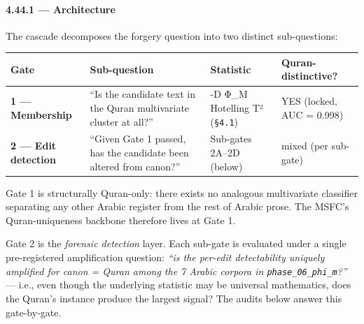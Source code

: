 \documentclass[
]{article}
\newcounter{none} %
\begin{document}
\paragraph{4.44.1 --- Architecture}\label{architecture}

The cascade decomposes the forgery question into two distinct
sub-questions:

{\def\LTcaptype{none} %
\begin{longtable}[]{@{}
  >{\raggedright\arraybackslash}p{}
  >{\raggedright\arraybackslash}p{}
  >{\raggedright\arraybackslash}p{}
  >{\raggedright\arraybackslash}p{}@{}}
\toprule\noalign{}
\begin{minipage}[b]{\linewidth}\raggedright
Gate
\end{minipage} & \begin{minipage}[b]{\linewidth}\raggedright
Sub-question
\end{minipage} & \begin{minipage}[b]{\linewidth}\raggedright
Statistic
\end{minipage} & \begin{minipage}[b]{\linewidth}\raggedright
Quran-distinctive?
\end{minipage} \\
\midrule\noalign{}
\endhead
\bottomrule\noalign{}
\endlastfoot
\textbf{1 --- Membership} & ``Is the candidate text in the Quran
multivariate cluster at all?'' & 5-D Φ\_M Hotelling T² (\texttt{§4.1}) &
YES (locked, AUC = 0.998) \\
\textbf{2 --- Edit detection} & ``Given Gate 1 passed, has the candidate
been altered from canon?'' & Sub-gates 2A--2D (below) & mixed (per
sub-gate) \\
\end{longtable}
}

Gate 1 is structurally Quran-only: there exists no analogous
multivariate classifier separating any other Arabic register from the
rest of Arabic prose. The MSFC's Quran-uniqueness backbone therefore
lives at Gate 1.

Gate 2 is the \emph{forensic detection} layer. Each sub-gate is
evaluated under a single pre-registered amplification question:
\emph{``is the per-edit detectability uniquely amplified for canon =
Quran among the 7 Arabic corpora in \texttt{phase\_06\_phi\_m}?''} ---
i.e., even though the underlying statistic may be universal mathematics,
does the Quran's instance produce the largest signal? The audits below
answer this gate-by-gate.
\end{document}
